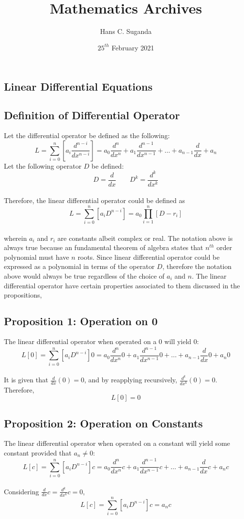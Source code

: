 \documentclass[a4paper, 12pt]{report}
\def\f{\frac}
\def\l{\left}
\def\r{\right}
\def\dst{\displaystyle}
\let\stdsection\section
\renewcommand\section{\newpage\stdsection}
\begin{document}
\title{Mathematics Archives}
\author{Hans C. Suganda}
\date{$25^{th}$ February 2021}
\maketitle
\newpage

\tableofcontents

\begin{center}
\section{Linear Differential Equations}
\subsection{Definition of Differential Operator}
Let the differential operator be defined as the following: 
$$L = \sum_{i = 0}^{n}\l[a_i \f{d^{n - i}}{dx^{n - i}}\r] = a_0 \f{d^{n }}{dx^{n}} + a_1 \f{d^{n - 1}}{dx^{n - 1}}+ \dots + a_{n - 1}\f{d}{dx} + a_n$$
Let the following operator $D$ be defined:
$$D = \f{d}{dx} \qquad D^k = \f{d^k}{dx^k}$$
\\Therefore, the linear differential operator could be defined as 
$$L = \sum_{i = 0}^{n}\l[a_i D^{n - i}\r] = a_0\prod_{i = 1}^{n}\l[D - r_i\r]$$
\\wherein $a_i$ and $r_i$ are constants albeit complex or real. The notation above is always true because an fundamental theorem of algebra states that $n^{th}$ order polynomial must have $n$ roots. Since linear differential operator could be expressed as a polynomial in terms of the operator $D$, therefore the notation above would always be true regardless of the choice of $a_i$ and $n$. The linear differential operator have certain properties associated to them discussed in the propositions,
\subsection{Proposition 1: Operation on 0} 
The linear differential operator when operated on a 0 will yield 0:
$$L[0]=\sum_{i = 0}^{n}\l[a_i D^{n - i}\r]0=a_0 \f{d^{n }}{dx^{n}}0 + a_1 \f{d^{n - 1}}{dx^{n - 1}}0+ \dots + a_{n - 1}\f{d}{dx}0 + a_n0$$ 
\\It is given that $\dst{\f{d}{dx}(0) = 0}$, and by reapplying recursively, $\dst{\f{d^k}{dx^k}(0) = 0}$. Therefore, 
$$L[0]=0$$
\subsection{Proposition 2: Operation on Constants}
The linear differential operator when operated on a constant will yield some constant provided that $a_n \neq 0$:
$$L[c] = \sum_{i = 0}^{n}\l[a_i D^{n - i}\r]c = a_0 \f{d^{n }}{dx^{n}}c + a_1 \f{d^{n - 1}}{dx^{n - 1}}c+ \dots + a_{n - 1}\f{d}{dx}c + a_nc$$
\\Considering $\dst{\f{d}{dx}c = \f{d^k}{dx^k}c = 0}$,
$$L[c] = \sum_{i = 0}^{n}\l[a_i D^{n - i}\r]c = a_nc$$

\end{center}
\end{document}
